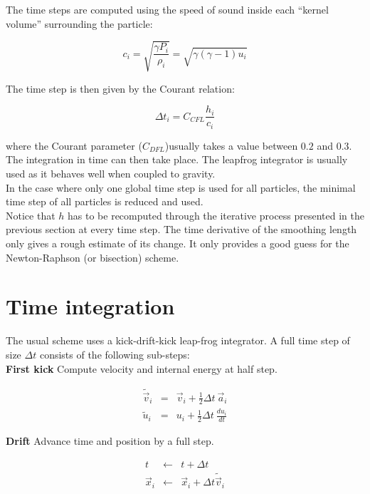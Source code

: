 \documentclass[a4paper,10pt]{article}
\begin{document}
The time steps are computed using the speed of sound inside each ``kernel volume'' surrounding the particle:

\begin{equation}
 c_i = \sqrt{\frac{\gamma P_i}{\rho_i}} = \sqrt{\gamma (\gamma-1)u_i}
\end{equation}

The time step is then given by the Courant relation:

\begin{equation}
 \Delta t_i = C_{CFL} \frac{h_i}{c_i}
\end{equation}

where the Courant parameter ($C_{DFL}$)usually takes a value between $0.2$ and $0.3$. The integration in time can then
take place. The
leapfrog integrator is usually used as it behaves well when coupled to gravity. \\
In the case where only one global time step is used for all particles, the minimal time step of all particles is reduced
and used. \\

Notice that $h$ has to be recomputed through the iterative process
presented in the previous section at every time step. The time
derivative of the smoothing length only gives a rough estimate of its
change. It only provides a good guess for the Newton-Raphson (or
bisection) scheme.

\section{Time integration}

The usual scheme uses a kick-drift-kick leap-frog integrator. A full time step of size $\Delta t$ consists of the
following sub-steps: \\

\textbf{First kick} Compute velocity and internal energy at half step.

\begin{eqnarray*}
 \tilde {\vec{v}}_i &=& \vec{v}_i + \textstyle\frac{1}{2}\Delta t ~\vec{a}_i \\
 \tilde u_i &=& u_i + \textstyle\frac{1}{2}\Delta t ~\frac{du_i}{dt}
\end{eqnarray*}

\textbf{Drift} Advance time and position by a full step.

\begin{eqnarray*}
 t &\leftarrow& t + \Delta t \\
 \vec{x}_i &\leftarrow& \vec{x}_i + \Delta t \tilde {\vec{v}}_i\\
\end{eqnarray*}
\end{document}
